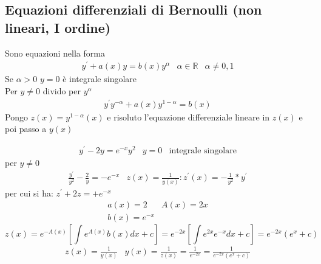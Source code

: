 \subsection{Equazioni differenziali di Bernoulli (non lineari, I ordine)}
Sono equazioni nella forma
\begin{eqnarray*}
	y^\prime + a(x)y=b(x)y^\alpha &\alpha\in \mathds{R} & \alpha\neq 0,1
\end{eqnarray*}
Se $\alpha >0$ $y=0$ è integrale singolare\\
Per $y\neq 0$ divido per $y^\alpha$
\begin{eqnarray}
	y^\prime y^{-\alpha}+a(x)y^{1-\alpha}=b(x)
\end{eqnarray}
Pongo $z(x)=y^{1-\alpha}(x)$ e risoluto l'equazione differenziale lineare in
$z(x)$ e poi passo a $y(x)$
\begin{esempio}
	\begin{eqnarray*}
		y^\prime-2y =e^{-x}y^2 & y=0 &\text{integrale singolare}
	\end{eqnarray*}
	per $y\neq 0$
	\begin{eqnarray*}
		\frac{y^\prime}{y^2}-\frac{2}{y}=-e^{-x} &
		z(x)=\frac{1}{y(x)}:z^\prime(x)=-\frac{1}{y^2}*y^\prime
	\end{eqnarray*}
	per cui si ha: $z^\prime+2z=+e^{-x}$
	\begin{eqnarray*}
		a(x)=2 & A(x)=2x\\
		b(x)=e^{-x}
	\end{eqnarray*}
	\begin{equation*}
		z(x)=e^{-A(x)}\left[\int e^{A(x)}b(x)dx+c\right]=e^{-2x}\left[\int
		e^{2x}e^{-x}dx+c\right]=e^{-2x}(e^x+c)
	\end{equation*}
	\begin{eqnarray*}
		z(x)=\frac{1}{y(x)} &
		y(x)=\frac{1}{z(x)}=\frac{1}{e^{-2x}}=\frac{1}{e^{-2x}(e^x+c)}
	\end{eqnarray*}
\end{esempio}
\clearpage
